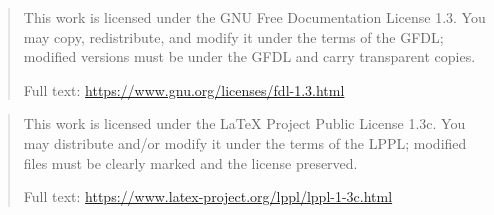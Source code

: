 \expandafter\def\csname qthesis@licensetext@GFDL-1.3\endcsname{%
  \begin{quote}\small\raggedright
    This work is licensed under the GNU Free Documentation License 1.3. You may copy, redistribute, and modify it under the terms of the GFDL; modified versions must be under the GFDL and carry transparent copies.

    Full text: \url{https://www.gnu.org/licenses/fdl-1.3.html}
  \end{quote}%
}
\expandafter\def\csname qthesis@licensetext@LPPL-1.3c\endcsname{%
  \begin{quote}\small\raggedright
    This work is licensed under the LaTeX Project Public License 1.3c. You may distribute and/or modify it under the terms of the LPPL; modified files must be clearly marked and the license preserved.

    Full text: \url{https://www.latex-project.org/lppl/lppl-1-3c.html}
  \end{quote}%
}

\makeatother
